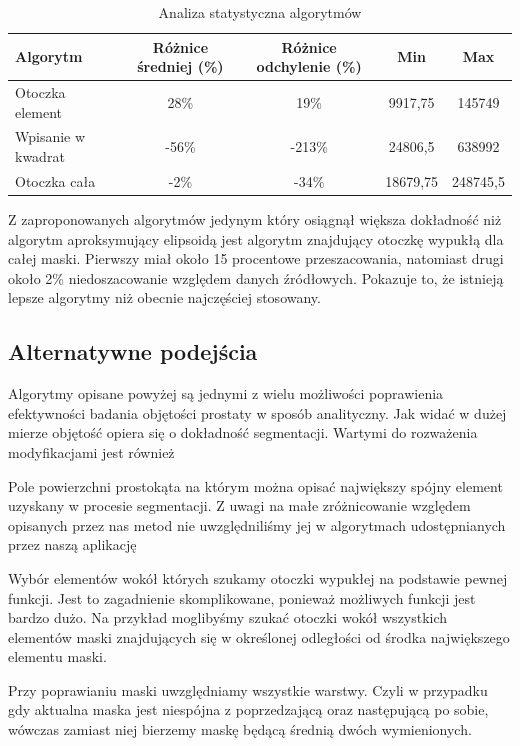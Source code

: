 \documentclass[a4paper,11pt,twoside]{report}
\theoremstyle{definition}
\begin{document}
\begin{table}[h!]
\caption{Analiza statystyczna algorytmów}
\centering
\begin{tabular}{|l|c|c|c|c|} \hline  
Algorytm & Różnice średniej (\%) & Różnice odchylenie (\%) & Min & Max \\ \hline 
Otoczka element	       & 28\%	            & 19\%	                & 9917,75	          &   145749           \\ \hline
Wpisanie w kwadrat	   & -56\%	            & -213\%	                & 24806,5	          &   638992           \\ \hline
Otoczka cała	       & -2\%	            & -34\%	                & 18679,75	          &   248745,5         \\ \hline
\end{tabular}
\label{Analiza statystyczna algorytmów}
\end{table}

Z zaproponowanych algorytmów jedynym który osiągnął większa dokładność niż algorytm aproksymujący elipsoidą jest algorytm znajdujący otoczkę wypukłą dla całej maski. Pierwszy miał około 15 procentowe przeszacowania, natomiast drugi około 2\% niedoszacowanie względem danych źródłowych. Pokazuje to, że istnieją lepsze algorytmy niż obecnie najczęściej stosowany.

\subsection{Alternatywne podejścia}
Algorytmy opisane powyżej są jednymi z wielu możliwości poprawienia efektywności badania objętości prostaty w sposób analityczny. Jak widać w dużej mierze objętość opiera się o dokładność segmentacji. Wartymi do rozważenia modyfikacjami jest również
\begin{description}
\item Pole powierzchni prostokąta na którym można opisać największy spójny element uzyskany w procesie segmentacji. Z uwagi na małe zróżnicowanie względem opisanych przez nas metod nie uwzględniliśmy jej w algorytmach udostępnianych przez naszą aplikację
\item Wybór elementów wokół których szukamy otoczki wypukłej na podstawie pewnej funkcji. Jest to zagadnienie skomplikowane, ponieważ możliwych funkcji jest bardzo dużo. Na przykład moglibyśmy szukać otoczki wokół wszystkich elementów maski znajdujących się w określonej odległości od środka największego elementu maski.
\item Przy poprawianiu maski uwzględniamy wszystkie warstwy. Czyli w przypadku gdy aktualna maska jest niespójna z poprzedzającą oraz następującą po sobie, wówczas zamiast niej bierzemy maskę będącą średnią dwóch wymienionych.
\end{description}
\end{document}
